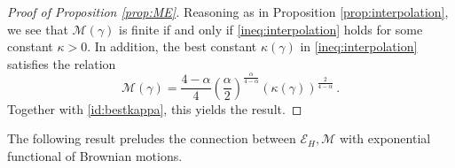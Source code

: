 \documentclass[12pt,reqno]{amsart}
\theoremstyle{remark}
\newcommand{\1}{\mathbf{1}}
\def\RR{\mathbb{R}}
\def\cee{{\mathcal E}}
\def\cmm{{\mathcal M}}
\def\cff{{\mathcal F}}
\def\lt{\left}
\def\rt{\right}
\begin{document}
		\begin{proof}[Proof of Proposition \ref{prop:ME}]
			Reasoning as in Proposition \ref{prop:interpolation}, we see that $\cmm(\gamma)$ is finite if and only if \eqref{ineq:interpolation} holds for some constant $\kappa>0$. In addition, the best constant $\kappa(\gamma)$ in \eqref{ineq:interpolation} satisfies the relation
			\begin{equation*}
				\cmm(\gamma)=\frac{4- \alpha}{4} \lt(\frac \alpha2\rt)^{\frac \alpha{4- \alpha}}(\kappa(\gamma))^{\frac2{4- \alpha}}\,.
			\end{equation*}
			Together with \eqref{id:bestkappa}, this yields the result.
		\end{proof}
		{The following result preludes the connection between $\cee_H,\cmm$ with exponential functional of Brownian motions}.
\end{document}
